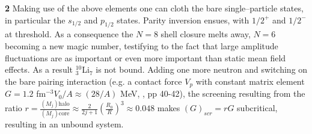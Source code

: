 \textbf{2} Making use of the above elements one can cloth the bare single--particle states, in particular the $s_{1/2}$ and $p_{1/2}$ states. Parity inversion ensues, with $1/2^+$ and $1/2^-$ at threshold. As a consequence the $N=8$ shell closure melts away, $N=6$ becoming a new magic number, testifying to the fact that  large amplitude fluctuations are as important or even more important than static mean field effects. As a result $^{10}_3$Li$_7$ is not bound. Adding one more neutron and switching on the bare pairing interaction (e.g. a contact force $V_p$ with constant matrix element $G=1.2$ fm$^{-3}V_0/A\approx (28/A)$ MeV, \cite{Brink:05}, pp 40-42), the screening resulting from the ratio $r=\frac{(M_j)\text{halo}}{(M_j)\text{core}}\approx \frac{2}{2j+1}\left(\frac{R_0}{R}\right)^3\approx 0.048$ makes $(G)_{scr}=rG$ subcritical, resulting in an unbound system.

